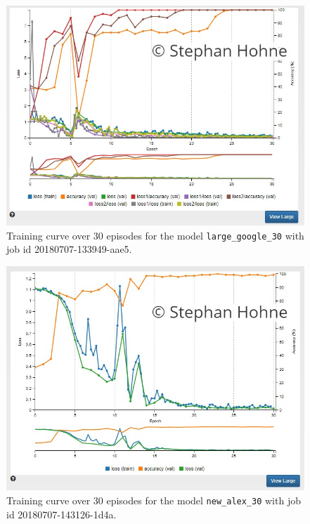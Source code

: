 \documentclass[10pt, journal, compsoc]{IEEEtran}
\begin{document}
\begin{figure}[htpb]
      \centering
      \includegraphics[width=\columnwidth]{images/training_curves/20180707-133949-aae5_training.PNG}
      \caption{Training curve over $30$ episodes for the model \texttt{large\_google\_30} with job id 20180707-133949-aae5.}
      \label{fig:20180707-133949-aae5_training}
\end{figure}

\begin{figure}[htpb]
      \centering
      \includegraphics[width=\columnwidth]{images/training_curves/20180707-143126-1d4a_training.PNG}
      \caption{Training curve over $30$ episodes for the model \texttt{new\_alex\_30} with job id 20180707-143126-1d4a.}
      \label{fig:20180707-143126-1d4a_training}
\end{figure}
\end{document}
